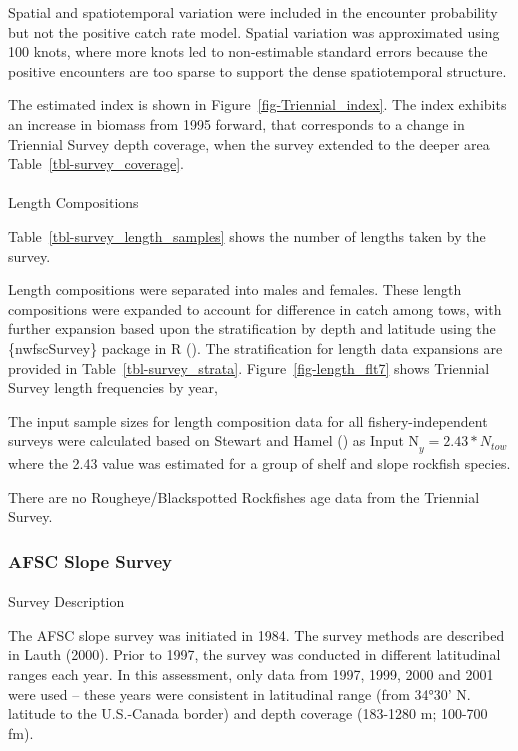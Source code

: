 \documentclass[
]{scrartcl}
\makeatletter
\let\oldparagraph\paragraph
\renewcommand{\paragraph}{
    \@ifstar
      \xxxParagraphStar
      \xxxParagraphNoStar
  }
\newcommand{\xxxParagraphStar}[1]{\oldparagraph*{#1}\mbox{}}
\newcommand{\xxxParagraphNoStar}[1]{\oldparagraph{#1}\mbox{}}
\makeatother
\begin{document}
Spatial and spatiotemporal variation were included in the encounter
probability but not the positive catch rate model. Spatial variation was
approximated using 100 knots, where more knots led to non-estimable
standard errors because the positive encounters are too sparse to
support the dense spatiotemporal structure.

The estimated index is shown in Figure~\ref{fig-Triennial_index}. The
index exhibits an increase in biomass from 1995 forward, that
corresponds to a change in Triennial Survey depth coverage, when the
survey extended to the deeper area Table~\ref{tbl-survey_coverage}.

\paragraph{Length Compositions}\label{length-compositions}

Table~\ref{tbl-survey_length_samples} shows the number of lengths taken
by the survey.

Length compositions were separated into males and females. These length
compositions were expanded to account for difference in catch among
tows, with further expansion based upon the stratification by depth and
latitude using the \{nwfscSurvey\} package in R
(). The stratification for length data expansions are provided in
Table~\ref{tbl-survey_strata}. Figure~\ref{fig-length_flt7} shows
Triennial Survey length frequencies by year,

The input sample sizes for length composition data for all
fishery-independent surveys were calculated based on Stewart and Hamel
() as
\(\text{Input N}_{y} = 2.43*N_{tow}\) where the 2.43 value was estimated
for a group of shelf and slope rockfish species.

There are no Rougheye/Blackspotted Rockfishes age data from the
Triennial Survey.

\subsubsection{AFSC Slope Survey}\label{afsc-slope-survey}

\paragraph{Survey Description}\label{survey-description-2}

The AFSC slope survey was initiated in 1984. The survey methods are
described in Lauth (2000). Prior to 1997, the survey was conducted in
different latitudinal ranges each year. In this assessment, only data
from 1997, 1999, 2000 and 2001 were used -- these years were consistent
in latitudinal range (from 34°30' N. latitude to the U.S.-Canada border)
and depth coverage (183-1280 m; 100-700 fm).
\end{document}
